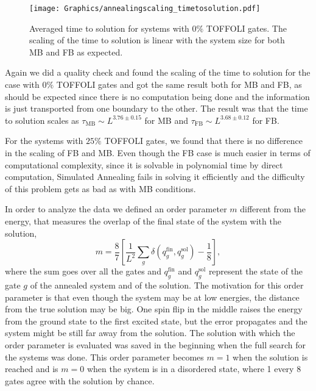\begin{figure}[hbtp]
  \centering
  \texttt{[image: Graphics/annealingscaling\_timetosolution.pdf]}
  \caption{Averaged time to solution for systems with $0\%$ TOFFOLI gates. The scaling of the time to solution is linear with the system size for both MB and FB as expected.}
  \label{fig:annealingscaling_timetosolution}
\end{figure}

Again we did a quality check and found the scaling of the time to solution for the case with $0\%$ TOFFOLI gates and got the same result both for MB and FB, as should be expected since there is no computation being done and the information is just transported from one boundary to the other.
The result was that the time to solution scales as $\tau_\text{MB} \sim L^{3.76\pm 0.15}$ for MB and $\tau_\text{FB} \sim L^{3.68\pm 0.12}$ for FB.

For the systems with $25\%$ TOFFOLI gates, we found that there is no difference in the scaling of FB and MB.
Even though the FB case is much easier in terms of computational complexity, since it is solvable in polynomial time by direct computation, Simulated Annealing fails in solving it efficiently and the difficulty of this problem gets as bad as with MB conditions.

In order to analyze the data we defined an order parameter $m$ different from the energy, that measures the overlap of the final state of the system with the solution,
\begin{equation}
  m = \frac{8}{7} \left[\frac{1}{L^2}\sum_g \delta(q_g^\text{fin},q_g^\text{sol}) -\frac{1}{8}\right],
\end{equation}
where the sum goes over all the gates and $q_g^\text{fin}$ and $q_g^\text{sol}$ represent the state of the gate $g$ of the annealed system and of the solution.
The motivation for this order parameter is that even though the system may be at low energies, the distance from the true solution may be big.
One spin flip in the middle raises the energy from the ground state to the first excited state, but the error propagates and the system might be still far away from the solution.
The solution with which the order parameter is evaluated was saved in the beginning when the full search for the systems was done.
This order parameter becomes $m=1$ when the solution is reached and is $m=0$ when the system is in a disordered state, where 1 every 8 gates agree with the solution by chance.

